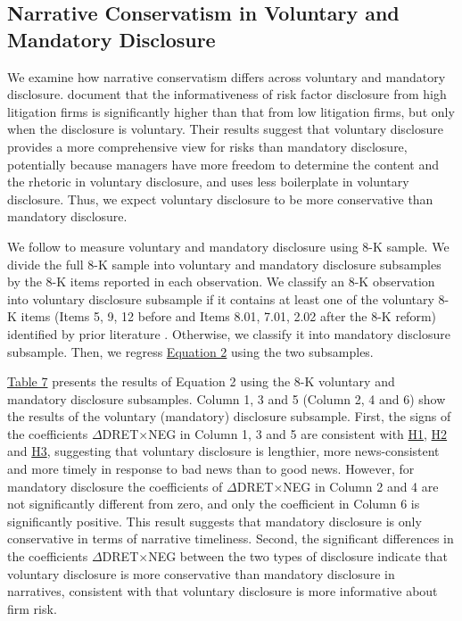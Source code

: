 \documentclass[letterpaper,11pt]{article}
\begin{document}
\begin{spacing}{1.5}
\subsection{Narrative Conservatism in Voluntary and Mandatory Disclosure}
We examine how narrative conservatism differs across voluntary and mandatory disclosure.  document that the informativeness of risk factor disclosure from high litigation firms is significantly higher than that from low litigation firms, but only when the disclosure is voluntary. Their results suggest that voluntary disclosure provides a more comprehensive view for risks than mandatory disclosure, potentially because managers have more freedom to determine the content and the rhetoric in voluntary disclosure, and uses less boilerplate in voluntary disclosure. Thus, we expect voluntary disclosure to be more conservative than mandatory disclosure.

We follow  to measure voluntary and mandatory disclosure using 8-K sample. We divide the full 8-K sample into voluntary and mandatory disclosure subsamples by the 8-K items reported in each observation. We classify an 8-K observation into voluntary disclosure subsample if it contains at least one of the voluntary 8-K items (Items 5, 9, 12 before and Items 8.01, 7.01, 2.02 after the 8-K reform) identified by prior literature \cite{lermanNewForm8K2010, heMeasuringDisclosureUsing2020}. Otherwise, we classify it into mandatory disclosure subsample. Then, we regress \hyperref[eq2]{Equation 2} using the two subsamples. 

\hyperref[T7PA]{Table 7} presents the results of Equation 2 using the 8-K voluntary and mandatory disclosure subsamples. Column 1, 3 and 5 (Column 2, 4 and 6) show the results of the voluntary (mandatory) disclosure subsample. First, the signs of the coefficients $\Delta$DRET$\times$NEG in Column 1, 3 and 5 are consistent with \hyperref[h1]{H1}, \hyperref[h2]{H2} and \hyperref[h3]{H3}, suggesting that voluntary disclosure is lengthier, more news-consistent and more timely in response to bad news than to good news. However, for mandatory disclosure the coefficients of $\Delta$DRET$\times$NEG in Column 2 and 4 are not significantly different from zero, and only the coefficient in Column 6 is significantly positive. This result suggests that mandatory disclosure is only conservative in terms of narrative timeliness. Second, the significant differences in the coefficients $\Delta$DRET$\times$NEG between the two types of disclosure indicate that voluntary disclosure is more conservative than mandatory disclosure in narratives, consistent with  that voluntary disclosure is more informative about firm risk.


\end{spacing}
\end{document}
